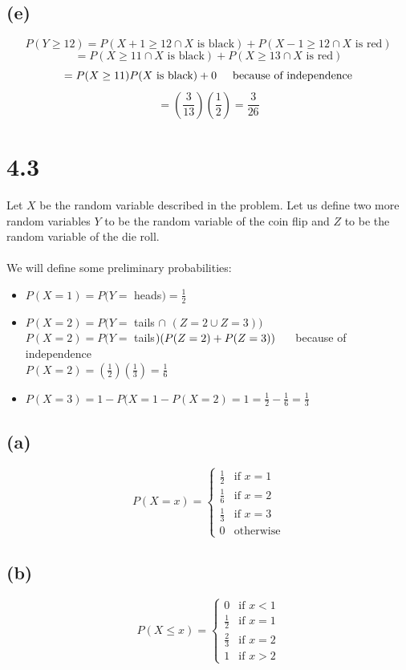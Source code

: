 \documentclass[11pt]{article}
\begin{document}
\subsection*{(e)}
\[P(Y\geq 12)=P(X+1\geq12\cap X \text{ is black})+P(X-1\geq12\cap X\text{ is red})\]
\[=P(X\geq11 \cap X \text{ is black})+P(X\geq 13\cap  X\text{ is red})\]
\[=P(X\geq11)P(X\text{ is black})+0\hspace{5mm}\text{because of independence}\]
\[=\left(\frac{3}{13}\right)\left(\frac{1}{2}\right)=\frac{3}{26}\]

\section*{4.3}
Let $X$ be the random variable described in the problem. Let us define two more random variables $Y$ to be the random variable of the coin flip and $Z$ to be the random variable of the die roll. \\ \\
We will define some preliminary probabilities:
\begin{itemize}
	\item $P(X=1)=P(Y=$ heads$)=\frac{1}{2}$
	\item $P(X=2)=P(Y=$ tails $\cap$ $(Z=2\cup Z=3))$ \\
	$P(X=2)=P(Y=$ tails$)(P(Z=2)+P(Z=3))\hspace{5mm}$ because of independence \\
	$P(X=2)=\left(\frac{1}{2}\right)\left(\frac{1}{3}\right)=\frac{1}{6}$
	\item $P(X=3)=1-P(X=1-P(X=2)=1=\frac{1}{2}-\frac{1}{6}=\frac{1}{3}$
\end{itemize}
\subsection*{(a)}
\[P(X=x)=\begin{cases}
	\frac{1}{2} & \text{if }x=1 \\
	\frac{1}{6} & \text{if }x=2 \\
	\frac{1}{3} & \text{if }x=3 \\
	0 & \text{otherwise}
\end{cases}\]
\subsection*{(b)}
\[P(X\leq x)=\begin{cases}
	0 & \text{if }x<1 \\
	\frac{1}{2} & \text{if }x=1 \\
	\frac{2}{3} & \text{if }x=2 \\
	1 & \text{if }x>2
\end{cases}\]
\end{document}
